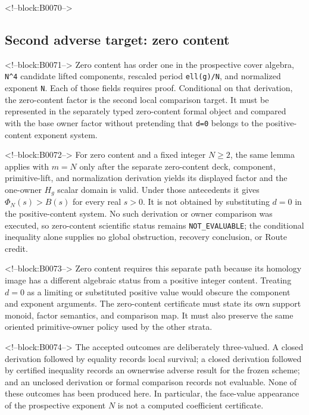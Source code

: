 \documentclass[11pt]{article}
\begin{document}
<!--block:B0070-->
\hypertarget{43-second-adverse-target-zero-content}{%
\subsection{Second adverse target: zero
content}\label{43-second-adverse-target-zero-content}}

<!--block:B0071-->
Zero content has order one in the prospective cover algebra,
\texttt{N\^{}4} candidate lifted components, rescaled period
\texttt{ell(g)/N}, and normalized exponent \texttt{N}. Each of those
fields requires proof. Conditional on that derivation, the zero-content
factor is the second local comparison target. It must be represented in
the separately typed zero-content formal object and compared with the
base owner factor without pretending that \texttt{d=0} belongs to the
positive-content exponent system.

<!--block:B0072-->
For zero content and a fixed integer \(N\geq2\), the same lemma applies
with \(m=N\) only after the separate zero-content deck, component,
primitive-lift, and normalization derivation yields its displayed factor and the
one-owner \(H_g\) scalar domain is valid.  Under those antecedents it gives
\(\Phi_N(s)>B(s)\) for every real \(s>0\).  It is not obtained by substituting
\(d=0\) in the positive-content system.  No such derivation or owner comparison
was executed, so zero-content scientific status remains
\texttt{NOT\_EVALUABLE}; the conditional inequality alone supplies no global
obstruction, recovery conclusion, or Route credit.

<!--block:B0073-->
Zero content requires this separate path because its homology image has
a different algebraic status from a positive integer content. Treating
$d=0$ as a limiting or substituted positive value would obscure the
component and exponent arguments. The zero-content certificate must
state its own support monoid, factor semantics, and comparison map. It
must also preserve the same oriented primitive-owner policy used by the
other strata.

<!--block:B0074-->
The accepted outcomes are deliberately three-valued. A closed
derivation followed by equality records local survival; a closed
derivation followed by certified inequality records an ownerwise
adverse result for the frozen scheme; and an unclosed derivation or
formal comparison records not evaluable. None of these outcomes has
been produced here. In particular, the face-value appearance of the
prospective exponent $N$ is not a computed coefficient certificate.
\end{document}

